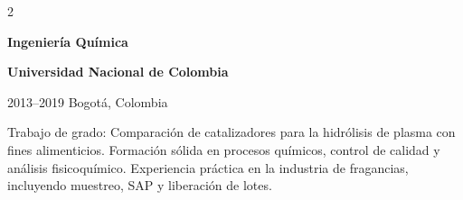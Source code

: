 \documentclass[10pt,a4paper]{altacv}
\renewcommand{\cvevent}[4]{%
  {\large\bfseries\color{emphasis}#1\par}
  \smallskip
  \textbf{\color{accent}#2}\par
  \smallskip
  {\small\faCalendar \hspace{0.5em}#3\hspace{2em}%
  \ifstrequal{#4}{}{}{\faMapMarker\hspace{0.5em}#4}\par}
  \medskip
}
\begin{document}
\begin{multicols}{2}
\vspace{0.4cm}
\cvevent{Ingeniería Química}{Universidad Nacional de Colombia}{2013--2019}{Bogotá, Colombia}
{\justifying Trabajo de grado: Comparación de catalizadores para la hidrólisis de plasma con fines alimenticios. Formación sólida en procesos químicos, control de calidad y análisis fisicoquímico. Experiencia práctica en la industria de fragancias, incluyendo muestreo, SAP y liberación de lotes.\par}

\end{multicols}
\end{document}
